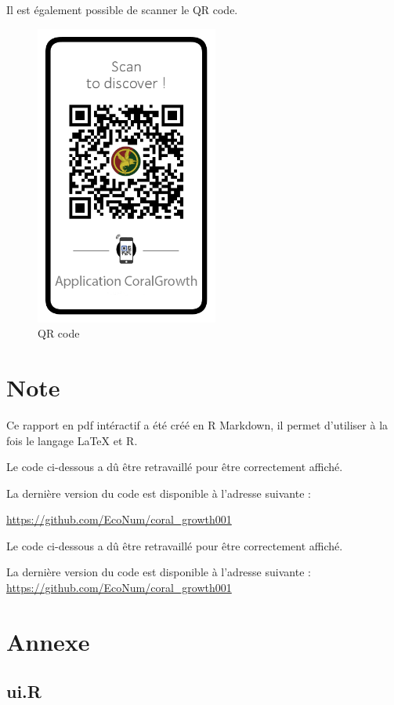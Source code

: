 \documentclass[]{report}
\begin{document}
Il est également possible de scanner le QR code.

\begin{figure}[h!]
\begin{centering}
\includegraphics[width=6cm]{../image/QRcode.png}
\caption{QR code}
\end{centering}
\end{figure}

\chapter{Note}\label{note}

Ce rapport en pdf intéractif a été créé en R Markdown, il permet
d'utiliser à la fois le langage LaTeX et R.

Le code ci-dessous a dû être retravaillé pour être correctement affiché.

La dernière version du code est disponible à l'adresse suivante :

\url{https://github.com/EcoNum/coral_growth001}

Le code ci-dessous a dû être retravaillé pour être correctement affiché.

La dernière version du code est disponible à l'adresse suivante :
\url{https://github.com/EcoNum/coral_growth001}

\chapter{Annexe}\label{annexe}

\section{ui.R}\label{ui.r}
\end{document}
